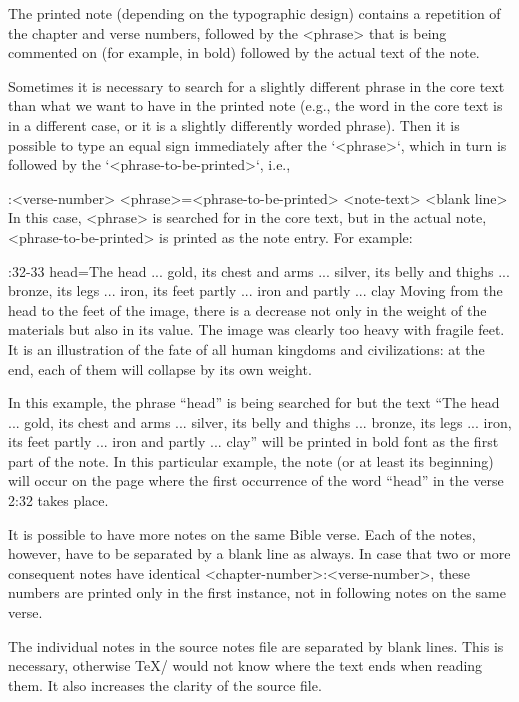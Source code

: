 The printed note (depending on the typographic design) contains
a repetition of the chapter and verse numbers, followed by the <phrase> that is being commented on
(for example, in bold) followed by the actual text of the note.

Sometimes it is necessary to search for a slightly different phrase in the core text than what
we want to have in the printed note (e.g., the word in the core text is in
a different case, or it is a slightly differently worded phrase). Then it is possible to type an equal sign immediately after the `{<phrase>}`, which in turn is followed by the  `{<phrase-to-be-printed>}`, i.e.,

\begtt
{}:<verse-number> {<phrase>}={<phrase-to-be-printed>}
<note-text>
<blank line>
\endtt
In this case, <phrase> is searched for in the core text, but in the actual
note, <phrase-to-be-printed> is printed as the note entry. For example:

\begtt
{}:32-33 {head}={The head ... gold, its chest and arms ... silver, its belly 
   and thighs ... bronze, its legs ... iron, its feet partly ... iron and partly ... clay} 
Moving from the head to the feet of the image, there is a decrease not only in the  weight
of the materials but also in its value. The image was clearly too heavy with fragile feet.
It is an illustration of the fate of all human kingdoms and civilizations:  at the end,
each of them will collapse by its own weight.
\endtt

In this example, the phrase “head” is being searched for but the text “The head ... gold, its chest and arms ... silver, its belly and thighs ... 
bronze, its legs ... iron, its feet partly ... iron and partly ... clay” will be printed in bold font as the first part of the note.
In this particular example, the note (or at least its beginning) will occur on the page where the first occurrence of the word “head” in the verse 2:32 takes place.

It is  possible to have more notes on the same Bible verse. Each of the notes, however, have to be separated by a blank line as always. 
In case that two or more consequent notes have identical <chapter-number>:<verse-number>, these numbers are printed only in the first instance, not in following notes on the same verse.

The individual notes in the source notes file are separated by blank
lines. This is necessary, otherwise \TeX/ would not know where the text ends when reading them. 
It also increases the clarity of the source file. 

